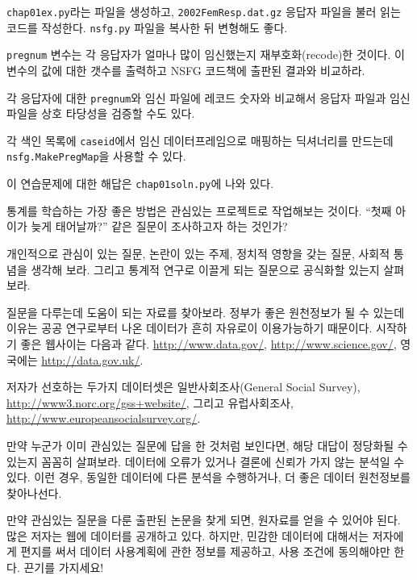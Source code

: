 \begin{exercise}
\verb"chap01ex.py"라는 파일을 생성하고, {\tt 2002FemResp.dat.gz} 응답자 파일을 불러 읽는 코드를 작성한다.
{\tt nsfg.py} 파일을 복사한 뒤 변형해도 좋다.

{\tt pregnum} 변수는 각 응답자가 얼마나 많이 임신했는지 재부호화(recode)한 것이다.
이 변수의 값에 대한 갯수를 출력하고 NSFG 코드책에 출판된 결과와 비교하라.

각 응답자에 대한 {\tt pregnum}와 임신 파일에 레코드 숫자와 비교해서 응답자 파일과 임신 파일을 상호 타당성을 검증할 수도 있다. 

각 색인 목록에 {\tt caseid}에서 임신 데이터프레임으로 매핑하는 딕셔너리를 만드는데 {\tt nsfg.MakePregMap}을 사용할 수 있다.

이 연습문제에 대한 해답은 \verb"chap01soln.py"에 나와 있다.
\end{exercise}


\begin{exercise}
통계를 학습하는 가장 좋은 방법은 관심있는 프로젝트로 작업해보는 것이다.
``첫째 아이가 늦게 태어날까?'' 같은 질문이 조사하고자 하는 것인가?

개인적으로 관심이 있는 질문, 논란이 있는 주제, 정치적 영향을 갖는 질문, 사회적 통념을 생각해 보라.
그리고 통계적 연구로 이끌게 되는 질문으로 공식화할 있는지 살펴보라.

질문을 다루는데 도움이 되는 자료를 찾아보라. 정부가 좋은 원천정보가 될 수 있는데 이유는 공공 연구로부터 나온 데이터가 
흔히 자유로이 이용가능하기 때문이다. 시작하기 좋은 웹사이는 다음과 같다. \url{http://www.data.gov/}, \url{http://www.science.gov/}, 영국에는 \url{http://data.gov.uk/}.

저자가 선호하는 두가지 데이터셋은 일반사회조사(General Social Survey), \url{http://www3.norc.org/gss+website/}, 
그리고 유럽사회조사, \url{http://www.europeansocialsurvey.org/}.

만약 누군가 이미 관심있는 질문에 답을 한 것처럼 보인다면, 해당 대답이 정당화될 수 있는지 꼼꼼히 살펴보라. 
데이터에 오류가 있거나 결론에 신뢰가 가지 않는 분석일 수 있다. 이런 경우, 동일한 데이터에 다른 분석을 수행하거나, 더 좋은 데이터 원천정보를 찾아나선다.

만약 관심있는 질문을 다룬 출판된 논문을 찾게 되면, 원자료를 얻을 수 있어야 된다. 많은 저자는 웹에 데이터를 공개하고 있다. 
하지만, 민감한 데이터에 대해서는 저자에게 편지를 써서 데이터 사용계획에 관한 정보를 제공하고, 사용 조건에 동의해야만 한다. 
끈기를 가지세요!

\end{exercise}


